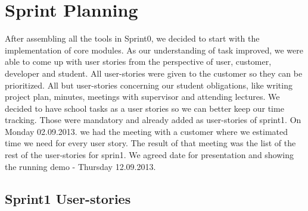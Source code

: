 \section{Sprint Planning}
After assembling all the tools in Sprint0, we decided to start with the implementation of core modules.
As our understanding of task improved, we were able to come up with user stories from the perspective of user, customer, developer and student.
All user-stories were given to the customer so they can be prioritized. 
All but user-stories concerning our student obligations, like writing project plan, minutes, meetings with supervisor and attending lectures.
We decided to have school tasks as a user stories so we can better keep our time tracking. 
Those were mandatory and already added as user-stories of sprint1.
On Monday 02.09.2013. we had the meeting with a customer where we estimated time we need for every user story.
The result of that meeting was the list of the rest of the user-stories for sprin1.
We agreed date for presentation and showing the running demo - Thursday 12.09.2013.

\subsection{Sprint1 User-stories}

